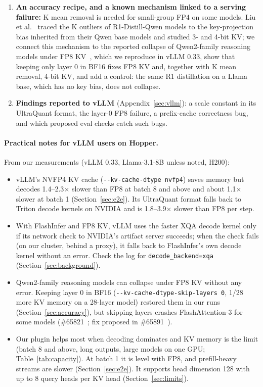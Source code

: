 \documentclass[11pt]{article}
\begin{document}
\begin{enumerate}
  \item \textbf{An accuracy recipe, and a known mechanism linked to a serving failure:} K mean removal is needed for small-group FP4 on some models. Liu et al.~\cite{liu2025quantreasoning} traced the K outliers of R1-Distill-Qwen models to the key-projection bias inherited from their Qwen base models and studied 3- and 4-bit KV; we connect this mechanism to the reported collapse of Qwen2-family reasoning models under FP8 KV~\cite{li2025rllmserving}, which we reproduce in vLLM 0.33, show that keeping only layer 0 in BF16 fixes FP8 KV and, together with K mean removal, 4-bit KV, and add a control: the same R1 distillation on a Llama base, which has no key bias, does not collapse.
  \item \textbf{Findings reported to vLLM} (Appendix~\ref{sec:vllm}): a scale constant in its UltraQuant format, the layer-0 FP8 failure, a prefix-cache correctness bug, and which proposed eval checks catch such bugs.
\end{enumerate}

\paragraph{Practical notes for vLLM users on Hopper.} From our measurements (vLLM 0.33, Llama-3.1-8B unless noted, H200):
\begin{itemize}
  \item vLLM's NVFP4 KV cache (\texttt{-{}-kv-cache-dtype nvfp4}) saves memory but decodes 1.4--2.3$\times$ slower than FP8 at batch 8 and above and about 1.1$\times$ slower at batch 1 (Section~\ref{sec:e2e}). Its UltraQuant format falls back to Triton decode kernels on NVIDIA and is 1.8--3.9$\times$ slower than FP8 per step.
  \item With FlashInfer and FP8 KV, vLLM uses the faster XQA decode kernel only if its network check to NVIDIA's artifact server succeeds; when the check fails (on our cluster, behind a proxy), it falls back to FlashInfer's own decode kernel without an error. Check the log for \texttt{decode\_backend=xqa} (Section~\ref{sec:background}).
  \item Qwen2-family reasoning models can collapse under FP8 KV without any error. Keeping layer 0 in BF16 (\texttt{-{}-kv-cache-dtype-skip-layers 0}, 1/28 more KV memory on a 28-layer model) restored them in our runs (Section~\ref{sec:accuracy}), but skipping layers crashes FlashAttention-3 for some models (\#65821~\cite{vllm65821}; fix proposed in \#65891~\cite{vllm65891}).
  \item Our plugin helps most when decoding dominates and KV memory is the limit (batch 8 and above, long outputs, large models on one GPU; Table~\ref{tab:capacity}). At batch 1 it is level with FP8, and prefill-heavy streams are slower (Section~\ref{sec:e2e}). It supports head dimension 128 with up to 8 query heads per KV head (Section~\ref{sec:limits}).
\end{itemize}
\end{document}
